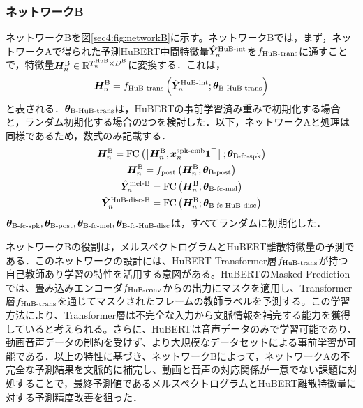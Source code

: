 \subsubsection{ネットワークB}
ネットワークBを図\ref{sec4:fig:networkB}に示す。ネットワークBでは，まず，ネットワークAで得られた予測HuBERT中間特徴量$\hat{\bm{Y}}^{\text{HuB-int}}_{n}$を$f_{\text{HuB-trans}}$に通すことで，特徴量$\bm{H}^{\text{B}}_{n} \in \mathbb{R}^{T^{\text{HuB}}_{n} \times D^{\text{B}}}$に変換する．これは，
\begin{equation}
    \bm{H}^{\text{B}}_{n} = f_{\text{HuB-trans}}\left(\hat{\bm{Y}}^{\text{HuB-int}}_{n}; \bm{\theta}_{\text{B-HuB-trans}}\right)
\end{equation}
と表される．$\bm{\theta}_{\text{B-HuB-trans}}$は，HuBERTの事前学習済み重みで初期化する場合と，ランダム初期化する場合の2つを検討した．以下，ネットワークAと処理は同様であるため，数式のみ記載する．
\begin{gather}
    \bm{H}^{\text{B}}_{n} = \text{FC}\left(\left[\bm{H}^{\text{B}}_{n}, \bm{x}^{\text{spk-emb}}_{n} \bm{1}^{\top}\right]; \bm{\theta}_{\text{B-fc-spk}}\right) \\
    \bm{H}^{\text{B}}_{n} = f_{\text{post}}\left(\bm{H}^{\text{B}}_{n}; \bm{\theta}_{\text{B-post}}\right) \\
    \hat{\bm{Y}}^{\text{mel-B}}_{n} = \text{FC}\left(\bm{H}^{\text{B}}_{n}; \bm{\theta}_{\text{B-fc-mel}}\right) \\
    \hat{\bm{Y}}^{\text{HuB-disc-B}}_{n} = \text{FC}\left(\bm{H}^{\text{B}}_{n}; \bm{\theta}_{\text{B-fc-HuB-disc}}\right)
\end{gather}
$\bm{\theta}_{\text{B-fc-spk}}, \bm{\theta}_{\text{B-post}}, \bm{\theta}_{\text{B-fc-mel}}, \bm{\theta}_{\text{B-fc-HuB-disc}}$は，すべてランダムに初期化した．

ネットワークBの役割は，メルスペクトログラムとHuBERT離散特徴量の予測である．このネットワークの設計には、HuBERT Transformer層$f_{\text{HuB-trans}}$が持つ自己教師あり学習の特性を活用する意図がある。HuBERTのMasked Predictionでは、畳み込みエンコーダ$f_{\text{HuB-conv}}$からの出力にマスクを適用し、Transformer層$f_{\text{HuB-trans}}$を通じてマスクされたフレームの教師ラベルを予測する。この学習方法により、Transformer層は不完全な入力から文脈情報を補完する能力を獲得していると考えられる。さらに、HuBERTは音声データのみで学習可能であり、動画音声データの制約を受けず、より大規模なデータセットによる事前学習が可能である．以上の特性に基づき、ネットワークBによって，ネットワークAの不完全な予測結果を文脈的に補完し、動画と音声の対応関係が一意でない課題に対処することで，最終予測値であるメルスペクトログラムとHuBERT離散特徴量に対する予測精度改善を狙った．

